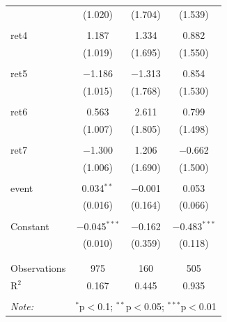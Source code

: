 \begin{table}[!htbp]
\begin{tabular}{@{\extracolsep{5pt}}lccc}
  & (1.020) & (1.704) & (1.539) \\ 
  & & & \\ 
 ret4 & 1.187 & 1.334 & 0.882 \\ 
  & (1.019) & (1.695) & (1.550) \\ 
  & & & \\ 
 ret5 & $-$1.186 & $-$1.313 & 0.854 \\ 
  & (1.015) & (1.768) & (1.530) \\ 
  & & & \\ 
 ret6 & 0.563 & 2.611 & 0.799 \\ 
  & (1.007) & (1.805) & (1.498) \\ 
  & & & \\ 
 ret7 & $-$1.300 & 1.206 & $-$0.662 \\ 
  & (1.006) & (1.690) & (1.500) \\ 
  & & & \\ 
 event & 0.034$^{**}$ & $-$0.001 & 0.053 \\ 
  & (0.016) & (0.164) & (0.066) \\ 
  & & & \\ 
 Constant & $-$0.045$^{***}$ & $-$0.162 & $-$0.483$^{***}$ \\ 
  & (0.010) & (0.359) & (0.118) \\ 
  & & & \\ 
\hline \\[-1.8ex] 
Observations & 975 & 160 & 505 \\ 
R$^{2}$ & 0.167 & 0.445 & 0.935 \\ 
\hline 
\hline \\[-1.8ex] 
\textit{Note:}  & \multicolumn{3}{r}{$^{*}$p$<$0.1; $^{**}$p$<$0.05; $^{***}$p$<$0.01} \\ 
\end{tabular} 
\end{table} 

